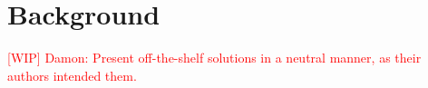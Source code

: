 \documentclass[a4paper,12pt,twoside,openright]{article}
\newcommand{\crit}[1]{\textcolor{red}{#1}}
\begin{document}
\section{Background}

\crit{[WIP] Damon: Present off-the-shelf solutions in a neutral manner, as their authors intended them.}




\end{document}
